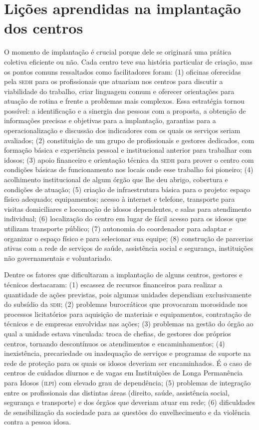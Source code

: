 \documentclass{article}
\begin{document}
\section{Lições aprendidas na implantação dos centros}

O momento de implantação é crucial porque dele se originará uma prática coletiva
eficiente ou não. Cada centro teve sua história particular de criação, mas os
pontos comuns ressaltados como facilitadores foram: (1) oficinas oferecidas pela
\textsc{sedh} para os profissionais que atuariam nos centros para discutir a viabilidade
do trabalho, criar linguagem comum e oferecer orientações para atuação de rotina
e frente a problemas mais complexos. Essa estratégia tornou possível: a
identificação e a sinergia das pessoas com a proposta, a obtenção de informações
precisas e objetivas para a implantação, garantias para a operacionalização e
discussão dos indicadores com os quais os serviços seriam avaliados; (2)
constituição de um grupo de profissionais e gestores dedicados, com formação
básica e experiência pessoal e institucional anterior para trabalhar com idosos;
(3) apoio financeiro e orientação técnica da \textsc{sedh} para prover o centro com
condições básicas de funcionamento nos locais onde esse trabalho foi pioneiro;
(4) acolhimento institucional de algum órgão que lhe deu abrigo, cobertura e
condições de atuação; (5) criação de infraestrutura básica para o projeto:
espaço físico adequado; equipamentos; acesso à internet e telefone, transporte
para visitas domiciliares e locomoção de idosos dependentes, e salas para
atendimento individual; (6) localização do centro em lugar de fácil acesso para
os idosos que utilizam transporte público; (7) autonomia do coordenador para
adaptar e organizar o espaço físico e para selecionar sua equipe; (8) construção
de parcerias ativas com a rede de serviços de saúde, assistência social e
segurança, instituições não governamentais e voluntariado.

Dentre os fatores que dificultaram a implantação de alguns centros, gestores e
técnicos destacaram: (1) escassez de recursos financeiros para realizar a
quantidade de ações previstas, pois algumas unidades dependiam exclusivamente do
subsídio da \textsc{sdh}; (2) problemas burocráticos que provocaram morosidade nos
processos licitatórios para aquisição de materiais e equipamentos, contratação
de técnicos e de empresas envolvidas nas ações; (3) problemas na gestão do órgão
ao qual a unidade estava vinculada: troca de chefias, de gestores dos próprios
centros, tornando descontínuos os atendimentos e encaminhamentos; (4)
inexistência, precariedade ou inadequação de serviços e programas de suporte na
rede de proteção para os quais os idosos deveriam ser encaminhados. É o caso de
centros de cuidados diurnos e de vagas em Instituições de Longa Permanência para
Idosos (\textsc{ilpi}) com elevado grau de dependência; (5) problemas de integração entre
os profissionais das distintas áreas (direito, saúde, assistência social,
segurança e transporte) e dos órgãos que deveriam atuar em rede; (6)
dificuldades de sensibilização da sociedade para as questões do envelhecimento e
da violência contra a pessoa idosa.
\end{document}
